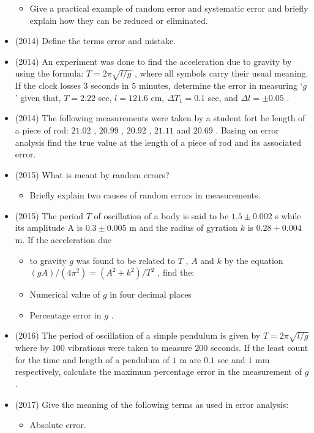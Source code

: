 \documentclass{article}
\begin{document}
\begin{itemize}
\begin{itemize}
\item Give a practical example of random error and systematic error and briefly explain how they can be reduced or eliminated.
\end{itemize}
\item (2014)  Define the terms error and mistake.
\item (2014)  An experiment was done to find the acceleration due to gravity by using the formula: $ T=2\pi\sqrt{l/g}$ , where all symbols carry their usual meaning.  If the clock losses $ 3$ seconds in $ 5$ minutes, determine the error in measuring ‘$ g$ ’ given that, $ T=2.22$ sec, $ l=121.6$ cm, $ \Delta T_{1}=0.1$ sec, and  $ \Delta l=\pm 0.05$ .
\item (2014)  The following measurements were taken by a student fort he length of a piece of rod: $ 21.02$ , $ 20.99$ , $ 20.92$ , $ 21.11$ and $ 20.69$ . Basing on error analysis find the true value at the length of a piece of rod and its associated error.
\item (2015)  What is meant by random errors?
 \begin{itemize}
\item Briefly explain two causes of random errors in measurements. 
\end{itemize}
\item (2015)  The period $ T$ of oscillation of a body is said to be $ 1.5\pm 0.002$ s while its amplitude A is $ 0.3\pm 0.005$ m and the radius of gyration $ k$ is $ 0.28+0.004$ m. If the acceleration due
 \begin{itemize}
\item to gravity $ g$ was found to be related to $ T$ , $ A$ and $ k$ by the equation $ (gA)/(4\pi^{2})=( A^{2}+k^{2})/T^{2}$ , find the:
\item Numerical value of $ g$ in four decimal places
\item Percentage error in $ g$ .
\end{itemize}
\item (2016)  The period of oscillation of a simple pendulum is given by $ T=2\pi\sqrt{l/g}$ where by $ 100$ vibrations were taken to measure $ 200$ seconds. If the least count for the time and length of a pendulum of $ 1$ m are $ 0.1$ sec and $ 1$ mm respectively, calculate the maximum percentage error in the measurement of $ g$ .
\item (2017)  Give the meaning of the following terms as used in error analysis:
 \begin{itemize}
\item Absolute error. 

\end{itemize}
\end{itemize}
\end{document}

